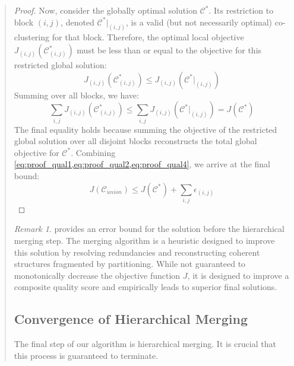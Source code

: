 \documentclass{ar2rc}
\theoremstyle{definition}
\theoremstyle{remark} %
\newtheorem*{remark*}{Remark}
\begin{document}
\begin{quote}
\begin{proof}
    Now, consider the globally optimal solution $\mathcal{C}^*$. Its restriction to block $(i,j)$, denoted $\mathcal{C}^*|_{(i,j)}$, is a valid (but not necessarily optimal) co-clustering for that block. Therefore, the optimal local objective $J_{(i,j)}(\mathcal{C}_{(i,j)}^*)$ must be less than or equal to the objective for this restricted global solution:
    \begin{equation}
      J_{(i,j)}(\mathcal{C}_{(i,j)}^*) \le J_{(i,j)}(\mathcal{C}^*|_{(i,j)})
    \end{equation}
    Summing over all blocks, we have:
    \begin{equation}
      \sum_{i,j} J_{(i,j)}(\mathcal{C}_{(i,j)}^*) \le \sum_{i,j} J_{(i,j)}(\mathcal{C}^*|_{(i,j)}) = J(\mathcal{C}^*)
    \end{equation}
    The final equality holds because summing the objective of the restricted global solution over all disjoint blocks reconstructs the total global objective for $\mathcal{C}^*$. Combining \cref{eq:proof_qual1,eq:proof_qual2,eq:proof_qual4}, we arrive at the final bound:
    \begin{equation}
      J(\mathcal{C}_{union}) \le J(\mathcal{C}^*) + \sum_{i,j} \epsilon_{(i,j)}
    \end{equation}
  \end{proof}
  \begin{remark*}
     provides an error bound for the solution before the hierarchical merging step. The merging algorithm is a heuristic designed to improve this solution by resolving redundancies and reconstructing coherent structures fragmented by partitioning. While not guaranteed to monotonically decrease the objective function $J$, it is designed to improve a composite quality score and empirically leads to superior final solutions.
  \end{remark*}

  \subsection*{ Convergence of Hierarchical Merging}
  The final step of our algorithm is hierarchical merging. It is crucial that this process is guaranteed to terminate.


\end{quote}
\end{document}
